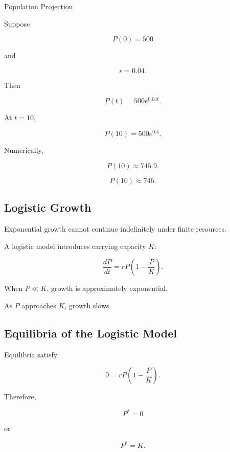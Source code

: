 \begin{workedexamplebox}{Population Projection}

Suppose

\[
P(0)=500
\]

and

\[
r=0.04.
\]

Then

\[
P(t)=500e^{0.04t}.
\]

At \(t=10\),

\[
P(10)
=
500e^{0.4}.
\]

Numerically,

\[
P(10)
\approx
745.9.
\]

\begin{answerbox}
\[
\boxed{
P(10)\approx746.
}
\]
\end{answerbox}

\end{workedexamplebox}

\subsection{Logistic Growth}
\label{subsec:logistic-growth-modeling}

Exponential growth cannot continue indefinitely under finite resources.

A logistic model introduces carrying capacity \(K\):

\[
\boxed{
\frac{dP}{dt}
=
rP
\left(
1-\frac{P}{K}
\right).
}
\]

When \(P\ll K\), growth is approximately exponential.

As \(P\) approaches \(K\), growth slows.

\subsection{Equilibria of the Logistic Model}
\label{subsec:logistic-equilibria}

Equilibria satisfy

\[
0
=
rP
\left(
1-\frac{P}{K}
\right).
\]

Therefore,

\[
\boxed{
P^*=0
}
\]

or

\[
\boxed{
P^*=K.
}
\]

